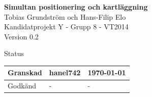 \documentclass[a4paper,12pt,fleqn]{article}
\begin{document}
	\pagestyle{fancy}
	\vspace*{\fill}
		\begingroup
			\begin{center}
				\huge{\textbf{Simultan positionering och kartläggning}}
				\\
				\vspace{10pt}
				\normalsize
				Tobias Grundström och Hans-Filip Elo
				\\
				Kandidatprojekt Y - Grupp 8 - VT2014
				\\
				Version 0.2
				\end{center}
		\endgroup
	\vspace*{\fill}

	\begin{center} %
		Status
		\\
		\vspace{3pt} %
	    \begin{tabular}{| p{3cm} | p{3cm} | p{3cm} |} %
	    \hline %
	    Granskad & hanel742 & \today \\ \hline %
		Godkänd & - & - \\ \hline %

	    \end{tabular}
	\end{center}
	\vspace{2cm}
	\newpage
\end{document}
